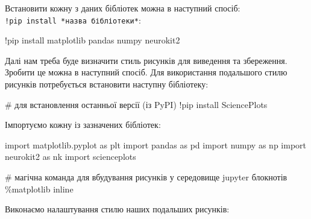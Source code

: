 \documentclass[
  letterpaper,
]{report}
\newenvironment{Shaded}{\begin{snugshade}}{\end{snugshade}}
\newcommand{\CommentTok}[1]{\textcolor[rgb]{0.37,0.37,0.37}{#1}}
\newcommand{\ImportTok}[1]{\textcolor[rgb]{0.00,0.46,0.62}{#1}}
\newcommand{\NormalTok}[1]{\textcolor[rgb]{0.00,0.23,0.31}{#1}}
\newcommand{\OperatorTok}[1]{\textcolor[rgb]{0.37,0.37,0.37}{#1}}
\begin{document}
Встановити кожну з даних бібліотек можна в наступний спосіб:
\texttt{!pip\ install\ *назва\ бібліотеки*}:

\begin{Shaded}
\begin{Highlighting}[]
\OperatorTok{!}\NormalTok{pip install matplotlib pandas numpy neurokit2}
\end{Highlighting}
\end{Shaded}

Далі нам треба буде визначити стиль рисунків для виведення та
збереження. Зробити це можна в наступний спосіб. Для використання
подальшого стилю рисунків потребується встановити наступну бібліотеку:

\begin{Shaded}
\begin{Highlighting}[]
\CommentTok{\# для встановлення останньої версії (із PyPI)}
\OperatorTok{!}\NormalTok{pip install SciencePlots}
\end{Highlighting}
\end{Shaded}

Імпортуємо кожну із зазначених бібліотек:

\begin{Shaded}
\begin{Highlighting}[]
\ImportTok{import}\NormalTok{ matplotlib.pyplot }\ImportTok{as}\NormalTok{ plt}
\ImportTok{import}\NormalTok{ pandas }\ImportTok{as}\NormalTok{ pd }
\ImportTok{import}\NormalTok{ numpy }\ImportTok{as}\NormalTok{ np}
\ImportTok{import}\NormalTok{ neurokit2 }\ImportTok{as}\NormalTok{ nk}
\ImportTok{import}\NormalTok{ scienceplots}

\CommentTok{\# магічна команда для вбудування рисунків у середовище jupyter блокнотів}
\OperatorTok{\%}\NormalTok{matplotlib inline  }
\end{Highlighting}
\end{Shaded}

Виконаємо налаштування стилю наших подальших рисунків:
\end{document}
